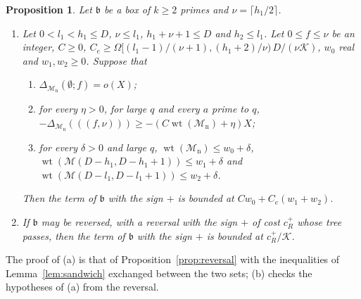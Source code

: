 \documentclass[11pt]{article}
\newtheorem{proposition}[theorem]{Proposition}
\theoremstyle{definition}
\begin{document}
\begin{proposition}\label{prop:reversal-plus}
Let $\mathfrak b$ be a box of $k \ge 2$ primes and $\nu = \lceil h_1/2 \rceil$.
\begin{enumerate}
\item[(a)] Let $0 < l_1 < h_1 \le D$, $\nu \le l_1$, $h_1 + \nu + 1 \le D$ and $h_2 \le l_1$. Let $0 \le f \le \nu$ be
  an integer, $C \ge 0$, $C_e \ge \Omega[(l_1 - 1)/(\nu + 1), (h_1 + 2)/\nu)\, D/(\nu\mathcal K)$, $w_0$ real and $w_1,
  w_2 \ge 0$. Suppose that
  \begin{enumerate}
  \item[(i)] $\Delta_{\mathcal M_{\mathrm n}}(\emptyset; f) = o(X)$;
  \item[(ii)] for every $\eta > 0$, for large $q$ and every $a$ prime to $q$, $-\Delta_{\mathcal M_{\mathrm n}}(((f,
    \nu))) \ge -(C \operatorname{wt}(\mathcal M_{\mathrm n}) + \eta) X$;
  \item[(iii)] for every $\delta > 0$ and large $q$, $\operatorname{wt}(\mathcal M_{\mathrm n}) \le w_0 + \delta$,
    $\operatorname{wt}(\mathcal M(D - h_1, D - h_1 + 1)) \le w_1 + \delta$ and $\operatorname{wt}(\mathcal M(D - l_1,
    D - l_1 + 1)) \le w_2 + \delta$.
  \end{enumerate}
  Then the term of $\mathfrak b$ with the sign $+$ is bounded at $C w_0 + C_e(w_1 + w_2)$.
\item[(b)] If $\mathfrak b$ may be reversed, with a reversal with the sign $+$ of cost $c_R^+$ whose tree passes, then
  the term of $\mathfrak b$ with the sign $+$ is bounded at $c_R^+/\mathcal K$.
\end{enumerate}
\end{proposition}

The proof of (a) is that of Proposition~\ref{prop:reversal} with the inequalities of Lemma~\ref{lem:sandwich}
exchanged between the two sets; (b) checks the hypotheses of (a) from the reversal.
\end{document}
